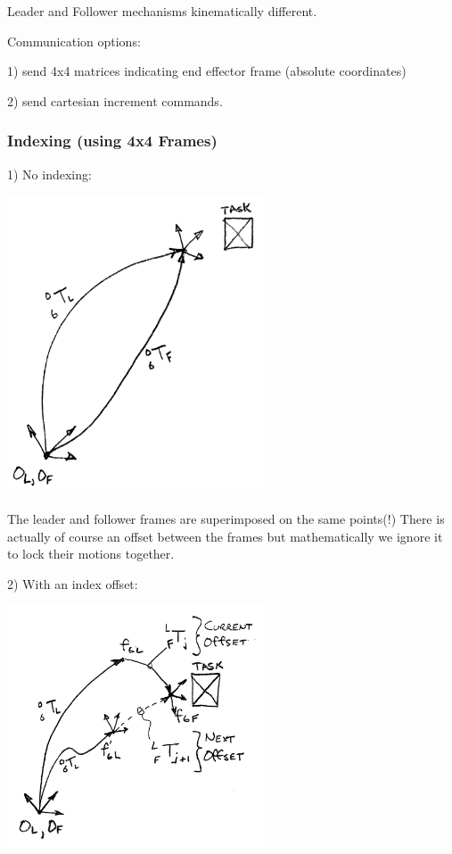 Leader and Follower mechanisms kinematically different.

Communication options:

1) send 4x4 matrices indicating end effector frame (absolute coordinates)

2) send cartesian increment commands.


\subsubsection{Indexing (using 4x4 Frames)}

1) No indexing:

\includegraphics[width=3.0in]{figs14/00405a.png}

 The leader and follower frames are superimposed on the same points(!)    There is actually of course an offset between the frames but mathematically we ignore it to lock their motions together. 	%



2) With an index offset:

\includegraphics[width=3.0in]{figs14/00406a.png}

